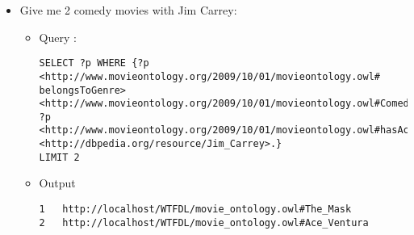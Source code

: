 \begin{itemize}
 \item Give me 2 comedy movies with Jim Carrey:
  \begin{itemize}
    \item Query : 
\begin{verbatim}
SELECT ?p WHERE {?p <http://www.movieontology.org/2009/10/01/movieontology.owl#
belongsToGenre> <http://www.movieontology.org/2009/10/01/movieontology.owl#Comedy>.
?p <http://www.movieontology.org/2009/10/01/movieontology.owl#hasActor>
<http://dbpedia.org/resource/Jim_Carrey>.}
LIMIT 2
\end{verbatim}
    \item Output
      \begin{lstlisting}
1	http://localhost/WTFDL/movie_ontology.owl#The_Mask	
2	http://localhost/WTFDL/movie_ontology.owl#Ace_Ventura
      \end{lstlisting}
    \end{itemize}

\end{itemize}